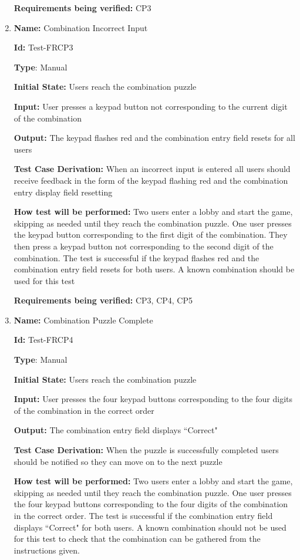 \documentclass[12pt, titlepage]{article}
\begin{document}
\begin{enumerate}
\textbf{Requirements being verified: } CP3

\item{\textbf{Name:} Combination Incorrect Input} \label{itm:Test-FRCP3}

\textbf{Id:} Test-FRCP3

\textbf{Type}: Manual

\textbf{Initial State:} Users reach the combination puzzle

\textbf{Input:} User presses a keypad button not corresponding to the current digit of the combination

\textbf{Output:} The keypad flashes red and the combination entry field resets for all users

\textbf{Test Case Derivation:} When an incorrect input is entered all users should receive feedback in the form of the keypad flashing red and the combination entry display field resetting

\textbf{How test will be performed:} Two users enter a lobby and start the game, skipping as needed until they reach the combination puzzle. One user presses the keypad button corresponding to the first digit of the combination. They then press a keypad button not corresponding to the second digit of the combination. The test is successful if the keypad flashes red and the combination entry field resets for both users. A known combination should be used for this test

\textbf{Requirements being verified: } CP3, CP4, CP5

\item{\textbf{Name:} Combination Puzzle Complete} \label{itm:Test-FRCP4}

\textbf{Id:} Test-FRCP4

\textbf{Type}: Manual

\textbf{Initial State:} Users reach the combination puzzle

\textbf{Input:} User presses the four keypad buttons corresponding to the four digits of the combination in the correct order

\textbf{Output:} The combination entry field displays ``Correct"

\textbf{Test Case Derivation:} When the puzzle is successfully completed users should be notified so they can move on to the next puzzle

\textbf{How test will be performed:} Two users enter a lobby and start the game, skipping as needed until they reach the combination puzzle. One user presses the four keypad buttons corresponding to the four digits of the combination in the correct order. The test is successful if the combination entry field displays ``Correct" for both users. A known combination should not be used for this test to check that the combination can be gathered from the instructions given.


\end{enumerate}
\end{document}
